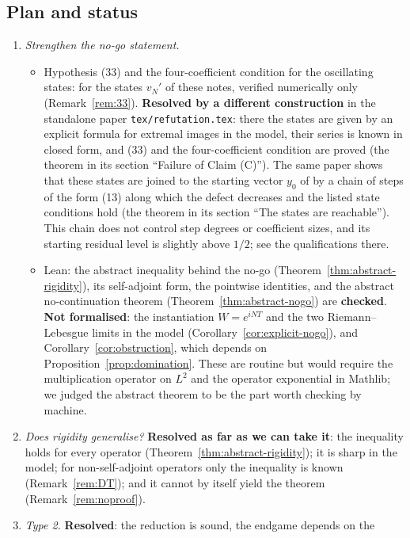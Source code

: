 \subsection{Plan and status}
\begin{enumerate}
\item \emph{Strengthen the no-go statement.}
\begin{itemize}
\item Hypothesis (33) and the four-coefficient condition for the oscillating states:
for the states $v_N'$ of these notes, verified numerically only (Remark~\ref{rem:33}).
\textbf{Resolved by a different construction} in the standalone paper
\texttt{tex/refutation.tex}: there the states are given by an explicit formula for extremal
images in the model, their series is known in closed form, and (33) and the four-coefficient
condition are proved (the theorem in its section ``Failure of Claim (C)''). The same paper shows that these states are joined
to the starting vector $y_0$ of \paper{} by a chain of steps of the form (13) along which the
defect decreases and the listed state conditions hold (the theorem in its section
``The states are reachable''). This chain does not control step degrees or coefficient
sizes, and its starting residual level is slightly above $1/2$; see the qualifications there.
\item Lean: the abstract inequality behind the no-go (Theorem~\ref{thm:abstract-rigidity}),
its self-adjoint form, the pointwise identities, and the abstract no-continuation theorem
(Theorem~\ref{thm:abstract-nogo}) are \textbf{checked}. \textbf{Not formalised}: the
instantiation $W=e^{iNT}$ and the two Riemann--Lebesgue limits in the model
(Corollary~\ref{cor:explicit-nogo}), and Corollary~\ref{cor:obstruction}, which depends on
Proposition~\ref{prop:domination}. These are routine but would require the multiplication
operator on $L^2$ and the operator exponential in Mathlib; we judged the abstract theorem to
be the part worth checking by machine.
\end{itemize}
\item \emph{Does rigidity generalise?} \textbf{Resolved as far as we can take it}: the
inequality holds for every operator (Theorem~\ref{thm:abstract-rigidity}); it is sharp in the
model; for non-self-adjoint operators only the inequality is known
(Remark~\ref{rem:DT}); and it cannot by itself yield the theorem
(Remark~\ref{rem:noproof}).
\item \emph{Type 2.} \textbf{Resolved}: the reduction is sound, the endgame depends on the

\end{enumerate}
